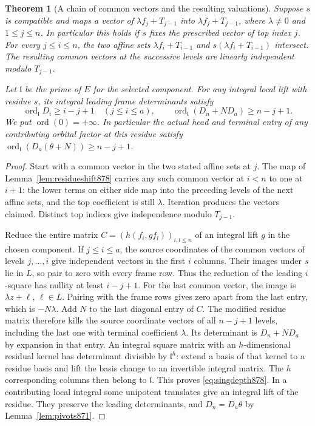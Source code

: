 \documentclass[a4paper,11pt]{article}
\newtheorem{theorem}[proposition]{Theorem}
\theoremstyle{definition}
\theoremstyle{remark}
\numberwithin{equation}{section}
\begin{document}
\begin{theorem}[A chain of common vectors and the resulting valuations]
\leavevmode\label{thm:singularflag878}
Suppose \(s\) is compatible and maps a vector of
\(\lambda f_j+T_{j-1}\) into \(\lambda f_j+T_{j-1}\), where
\(\lambda\ne0\) and \(1\le j\le n\). In particular this holds if
\(s\) fixes the prescribed vector of top index \(j\).
For every \(j\le i\le n\), the two affine sets
\(\lambda f_i+T_{i-1}\) and \(s(\lambda f_i+T_{i-1})\) intersect.
The resulting common vectors at the successive levels are linearly
independent modulo \(T_{j-1}\).

Let \(\mathfrak l\) be the prime of \(E\) for the selected component.
For any integral local lift with residue \(s\), its integral leading
frame determinants satisfy
\begin{equation}
 \operatorname{ord}_{\mathfrak l}D_i\ge i-j+1\quad(j\le i\le a),
 \qquad
 \operatorname{ord}_{\mathfrak l}(D_n+ND_a)\ge n-j+1.
 \label{eq:singdepth878}
\end{equation}
We put \(\operatorname{ord}(0)=+\infty\). In particular the actual
head and terminal entry of any contributing orbital factor at this
residue satisfy
\(\operatorname{ord}_{\mathfrak l}(D_a(\theta+N))\ge n-j+1\).
\end{theorem}
\begin{proof}
Start with a common vector in the two stated affine sets at \(j\).
The map of Lemma~\ref{lem:residueshift878} carries any such common
vector at \(i<n\) to one at \(i+1\): the lower terms on either
side map into the preceding levels of the next affine sets, and
the top coefficient is still \(\lambda\). Iteration produces the
vectors claimed. Distinct top indices give independence modulo
\(T_{j-1}\).

Reduce the entire matrix \(C=(h(f_i,g f_l))_{i,l\le n}\) of an
integral lift \(g\) in the chosen component. If \(j\le i\le a\),
the source coordinates of the common vectors of levels
\(j,\ldots,i\) give independent vectors in the first \(i\)
columns. Their images under \(s\) lie in \(L\), so pair to zero
with every frame row. Thus the reduction of the leading
\(i\)-square has nullity at least \(i-j+1\). For the last common
vector, the image is \(\lambda z+\ell\), \(\ell\in L\).
Pairing with the frame rows gives zero apart from the last
entry, which is \(-N\lambda\). Add \(N\) to the last diagonal
entry of \(C\). The modified residue matrix therefore kills
the source coordinate vectors of all \(n-j+1\) levels,
including the last one with terminal coefficient \(\lambda\).
Its determinant is \(D_n+N D_a\) by expansion in that entry.
An integral square matrix with an \(h\)-dimensional residual
kernel has determinant divisible by \(\mathfrak l^h\):
extend a basis of that kernel to a residue basis and lift the
basis change to an invertible integral matrix. The \(h\)
corresponding columns then belong to \(\mathfrak l\). This
proves \eqref{eq:singdepth878}. In a contributing local
integral some unipotent translates give an integral lift of
the residue. They preserve the leading determinants, and
\(D_n=D_a\theta\) by Lemma~\ref{lem:pivots871}.
\end{proof}
\end{document}

